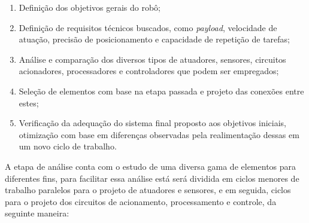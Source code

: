 \begin{enumerate}
    \item Definição dos objetivos gerais do robô;
    \item Definição de requisitos técnicos buscados, como \textit{payload}, velocidade de atuação, precisão de posicionamento e capacidade de repetição de tarefas;
    \item Análise e comparação dos diversos tipos de atuadores, sensores, circuitos acionadores, processadores e controladores que podem ser empregados;
    \item Seleção de elementos com base na etapa passada e projeto das conexões entre estes;
    \item Verificação da adequação do sistema final proposto aos objetivos iniciais, otimização com base em diferenças observadas pela realimentação dessas em um novo ciclo de trabalho.
\end{enumerate}

A etapa de análise conta com o estudo de uma diversa gama de elementos para diferentes fins, para facilitar essa análise está será dividida em ciclos menores de 
trabalho paralelos para o projeto de atuadores e sensores, e em seguida, ciclos para o projeto dos circuitos de acionamento, processamento e controle, da seguinte
maneira:

